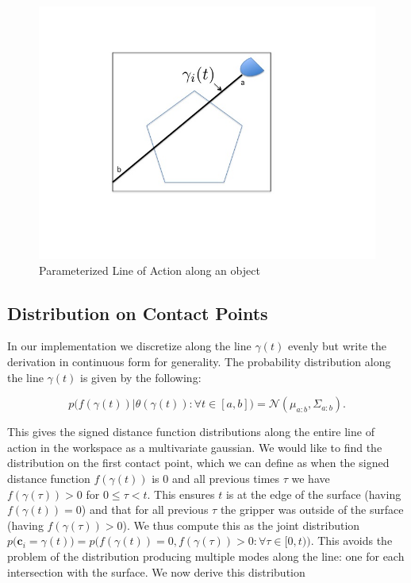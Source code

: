 \documentclass[letterpaper, 10 pt, conference]{ieeeconf}  %
\newcommand{\mN}{\mathcal{N}}
\begin{document}


\begin{figure}[ht!]
\centering
\includegraphics[scale = 0.3]{figures/Slide01.jpg}
\caption{Parameterized Line of Action along an object}
\vspace*{-10pt}
\label{fig:line_of_action}
\end{figure}
\subsection{Distribution on Contact Points} 
In our implementation we discretize along the line $\gamma(t)$ evenly but write the derivation in continuous form for generality.
The probability distribution along the line $\gamma(t)$ is given by the following:

\begin{equation}
p\big(f(\gamma(t))|\theta(\gamma(t)): \forall t \in [a,b] \big) 
=
\mN(\mu_{a:b},\Sigma_{a:b}).
\end{equation}

This gives the signed distance function distributions along the entire line of action in the workspace as a multivariate gaussian.
We would like to find the distribution on the first contact point, which we can define as when the signed distance function $f(\gamma(t))$ is $0$ and all previous times $\tau$ we have $f(\gamma(\tau)) > 0$ for $0 \leq \tau < t$.
This ensures $t$ is at the edge of the surface (having $f(\gamma(t)) = 0$) and that for all previous $\tau$ the gripper was outside of the surface (having $f(\gamma(\tau)) > 0$).
We thus compute this as the joint distribution $p\big(\textbf{c}_i= \gamma(t)\big) = p\big(f(\gamma(t))=0, f(\gamma(\tau))> 0: \forall \tau \in [0,t)\big)$.
This avoids the problem of the distribution producing multiple modes along the line: one for each intersection with the surface.
We now derive this distribution 
\end{document}
